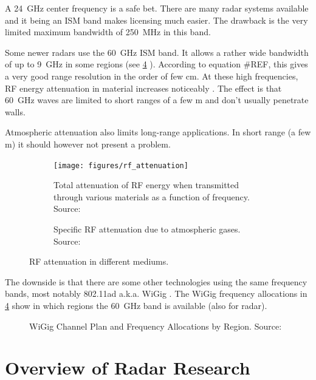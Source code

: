 A \SI{24}{GHz} center frequency is a safe bet. There are many radar
systems available and it being an ISM band makes licensing much easier.
The drawback is the very limited maximum bandwidth of \SI{250}{MHz} in this
band.

Some newer radars use the \SI{60}{GHz} ISM band. It allows a rather wide
bandwidth of up to \SI{9}{GHz} in some regions (see \cref{fig:wigig} ).
According to equation \#REF, this gives a very good range resolution in
the order of few \si{cm}. At these high frequencies, RF energy
attenuation in material increases noticeably \cite{FerrisJr.1998}. The
effect is that \SI{60}{GHz} waves are limited to short ranges of a few
\si{m} and don't usually penetrate walls.

Atmospheric attenuation also limits long-range applications. In short
range (a few \si{m}) it should however not present a problem.

\begin{figure}[htbp]
    \centering
    \begin{subfigure}[b]{0.475\textwidth}
        \texttt{[image: figures/rf\_attenuation]}
        \caption{\label{fig:attenuation}Total attenuation of RF energy when transmitted through various materials as a function of frequency. Source: \cite{FerrisJr.1998}}
    \end{subfigure}
    \hfill
    \begin{subfigure}[b]{0.475\textwidth}
        \def\svgwidth{\linewidth} \footnotesize
        
        \caption{\label{fig:attenuation_air}Specific RF attenuation due to atmospheric gases. Source: \cite{ITU1997}\bigskip}
    \end{subfigure}
    \caption{RF attenuation in different mediums.}
\end{figure}

The downside is that there are some other technologies using the same
frequency bands, most notably 802.11ad a.k.a.
WiGig \cite{AgilentTechnologies2013}. The WiGig frequency allocations in
\cref{fig:wigig} show in which regions the \SI{60}{GHz} band is available (also
for radar).

\begin{figure}[htbp]
    \centering
    \def\svgwidth{\linewidth}
    
    \caption{\label{fig:wigig}WiGig Channel Plan and Frequency Allocations by Region. Source: \cite{AgilentTechnologies2013}}
\end{figure}

\section{Overview of Radar Research}\label{overview-of-radar-research}

